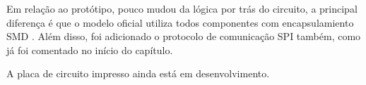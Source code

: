 \documentclass[../delivery_hospital_report.tex]{subfiles}
\begin{document}
Em relação ao protótipo, pouco mudou da lógica por trás do circuito, a principal diferença é que o modelo oficial utiliza todos componentes com encapsulamiento SMD \cite{SMD_def}. Além disso, foi adicionado o protocolo de comunicação SPI também, como já foi comentado no início do capítulo.


A placa de circuito impresso ainda está em desenvolvimento.

\end{document}

